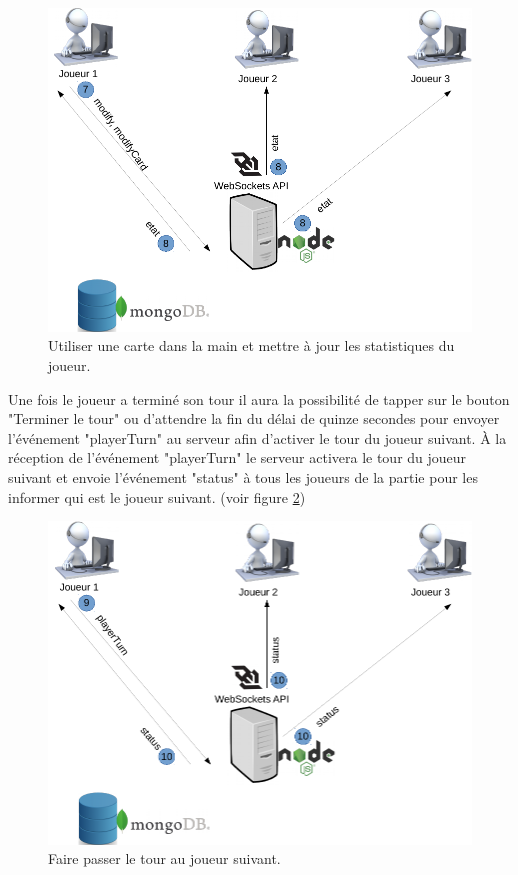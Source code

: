 \documentclass[12pt]{report}
\begin{document}
			\begin{figure}[h!]
		  	\centering
		    \includegraphics[scale=0.5]{images/useCase23.png}
		    \caption{Utiliser une carte dans la main et mettre à jour les statistiques du joueur.}
				\label{fig:useCase23}
		  \end{figure}

			Une fois le joueur a terminé son tour il aura la possibilité de tapper sur le bouton "Terminer le tour" ou d'attendre la fin du délai de quinze secondes pour envoyer l'événement "playerTurn" au serveur afin d'activer le tour du joueur suivant. À la réception de l'événement "playerTurn" le serveur activera le tour du joueur suivant et envoie l'événement "status" à tous les joueurs de la partie pour les informer qui est le joueur suivant. (voir figure \ref{fig:useCase24})

			\begin{figure}[h!]
		  	\centering
		    \includegraphics[scale=0.5]{images/useCase24.png}
		    \caption{Faire passer le tour au joueur suivant.}
				\label{fig:useCase24}
		  \end{figure}
\end{document}
